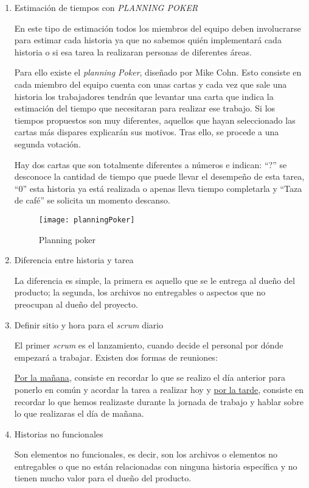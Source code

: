 \begin{enumerate}
	\item Estimación de tiempos con \textit{PLANNING POKER}
	
	En este tipo de estimación todos los miembros del equipo deben involucrarse para estimar cada historia ya que no sabemos quién implementará cada historia o si esa tarea la realizaran personas de diferentes áreas.
	
	Para ello existe el \textit{planning Poker}, diseñado por Mike Cohn. Esto consiste en cada miembro del equipo cuenta con unas cartas y cada vez que sale una historia los trabajadores tendrán que levantar una carta que indica la estimación del tiempo que necesitaran para realizar ese trabajo. Si los tiempos propuestos son muy diferentes, aquellos que hayan seleccionado las cartas más dispares explicarán sus motivos. Tras ello, se procede a una segunda votación.
	
	Hay dos cartas que son totalmente diferentes a números e indican: ``?'' se desconoce la cantidad de tiempo que puede llevar el desempeño de esta tarea, ``0'' esta historia ya está realizada o apenas lleva tiempo completarla y ``Taza de café'' se solicita un momento descanso.
	\begin{figure}[h]
		\centering
 		\texttt{[image: planningPoker]}
 		\caption{Planning poker}
	\end{figure}
	
 	\item Diferencia entre historia y tarea
 	
 	La diferencia es simple, la primera es aquello que se le entrega al dueño del producto; la segunda, los archivos no entregables o aspectos que no preocupan al dueño del proyecto.
 	
 	\item Definir sitio y hora para el \textit{scrum} diario
 	
 	El primer \textit{scrum} es el lanzamiento, cuando decide el personal por dónde empezará a trabajar. Existen dos formas de reuniones:
 	
 	\underline{Por la mañana}, consiste en recordar lo que se realizo el día anterior para ponerlo en común y acordar la tarea a realizar hoy y \underline{por la tarde}, consiste en recordar lo que hemos realizaste durante la jornada de trabajo y hablar sobre lo que realizaras el día de mañana.
 	
 	\item Historias no funcionales
 	
 	Son elementos no funcionales, es decir, son los archivos o elementos no entregables o que no están relacionadas con ninguna historia específica y no tienen mucho valor para el dueño del producto. 
 	

\end{enumerate}
